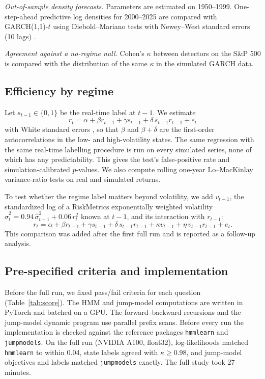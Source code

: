 \documentclass[conference]{IEEEtran}
\begin{document}
\emph{Out-of-sample density forecasts.} Parameters are estimated on 1950--1999. One-step-ahead predictive log densities for 2000--2025 are compared with GARCH(1,1)-$t$ using Diebold--Mariano tests \cite{dieboldmariano1995} with Newey--West standard errors (10 lags) \cite{neweywest1987}.

\emph{Agreement against a no-regime null.} Cohen's $\kappa$ between detectors on the S\&P 500 is compared with the distribution of the same $\kappa$ in the simulated GARCH data.

\subsection{Efficiency by regime}
Let $s_{t-1} \in \{0, 1\}$ be the real-time label at $t-1$. We estimate
\begin{equation}
r_t = \alpha + \beta r_{t-1} + \gamma s_{t-1} + \delta\, s_{t-1} r_{t-1} + e_t
\label{eq:ar}
\end{equation}
with White standard errors \cite{white1980}, so that $\beta$ and $\beta + \delta$ are the first-order autocorrelations in the low- and high-volatility states. The same regression with the same real-time labelling procedure is run on every simulated series, none of which has any predictability. This gives the test's false-positive rate and simulation-calibrated $p$-values. We also compute rolling one-year Lo--MacKinlay variance-ratio tests \cite{lomackinlay1988} on real and simulated returns.

To test whether the regime label matters beyond volatility, we add $v_{t-1}$, the standardized log of a RiskMetrics exponentially weighted volatility $\hat\sigma_t^2 = 0.94\,\hat\sigma_{t-1}^2 + 0.06\, r_t^2$ known at $t-1$, and its interaction with $r_{t-1}$:
\begin{equation}
r_t = \alpha + \beta r_{t-1} + \gamma s_{t-1} + \delta\, s_{t-1} r_{t-1} + \kappa v_{t-1} + \eta\, v_{t-1} r_{t-1} + e_t .
\label{eq:race}
\end{equation}
This comparison was added after the first full run and is reported as a follow-up analysis.

\subsection{Pre-specified criteria and implementation}
Before the full run, we fixed pass/fail criteria for each question (Table~\ref{tab:score}). The HMM and jump-model computations are written in PyTorch and batched on a GPU. The forward--backward recursions and the jump-model dynamic program use parallel prefix scans. Before every run the implementation is checked against the reference packages \texttt{hmmlearn} and \texttt{jumpmodels}. On the full run (NVIDIA A100, float32), log-likelihoods matched \texttt{hmmlearn} to within 0.04, state labels agreed with $\kappa \ge 0.98$, and jump-model objectives and labels matched \texttt{jumpmodels} exactly. The full study took 27 minutes.
\end{document}

